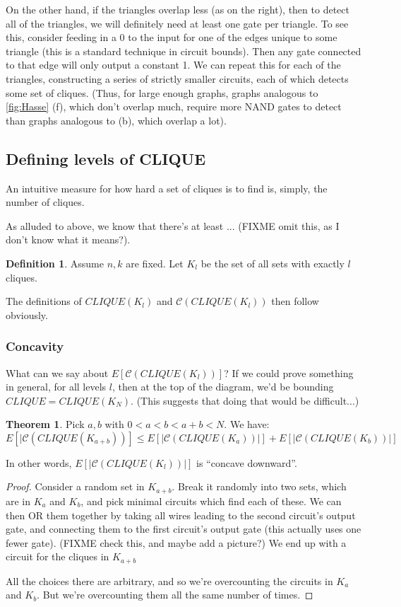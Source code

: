 \documentclass[12pt]{article}
\theoremstyle{definition}
\newtheorem{thm}{Theorem}[section]
\newtheorem{defn}{Definition}[section]
\newcommand{\bigC}[0]{\mathcal{C}}
\begin{document}
On the other hand, if the triangles overlap less (as on the right),
then to detect all of the triangles, we will definitely need at least one
gate per triangle.
To see this, consider feeding in a 0 to the input for one
of the edges unique to some triangle (this is a
standard technique in circuit bounds).
Then any gate connected to
that edge will only output a constant 1. We can repeat this for each of the
triangles, constructing a series of strictly smaller circuits, each of which 
detects some set of cliques. (Thus, for large enough graphs,
graphs analogous to \ref{fig:Hasse} (f), which don't overlap much,
require more NAND gates to detect than graphs 
analogous to (b), which overlap
a lot).

\subsection{Defining levels of CLIQUE}

An intuitive measure for how hard a set of cliques
is to find is, simply, the number of cliques.

As alluded to above, we know that there's at least ... 
(FIXME omit this, as I don't know what it means?).

\begin{defn}
\label{CLIQUE-level}
Assume $n, k$ are fixed. Let $K_l$ be the set of all sets
with exactly $l$ cliques. 
\end{defn}

The definitions of $CLIQUE(K_l)$ and $\bigC(CLIQUE(K_l))$ then
follow obviously.

\subsubsection{Concavity}

What can we say about $E[\bigC(CLIQUE(K_l))]$? If we could
prove something in general, for all levels $l$, then at
the top of the diagram, we'd be bounding
$CLIQUE = CLIQUE(K_N)$. (This suggests that doing that would
be difficult...)


\begin{thm}
\label{concavity}
Pick $a, b$ with $0 < a < b < a+b < N$. We have:
\[
E[|\bigC(CLIQUE(K_{a+b}))] \le
E[|\bigC(CLIQUE(K_a))|] + E[|\bigC(CLIQUE(K_b))|]
\]

In other words, $E[|\bigC(CLIQUE(K_l))|]$ is ``concave downward''.
\end{thm}
\begin{proof}
Consider a random set in $K_{a+b}$. Break it randomly into
two sets, which are in $K_a$ and $K_b$, and pick minimal
circuits which find each of these. We can then OR them together
by taking all wires leading to the second circuit's output gate,
and connecting them to the first circuit's output gate (this
actually uses one fewer gate).
(FIXME check this, and maybe add a picture?)
We end up
with a circuit for the cliques in $K_{a+b}$

All the choices there are arbitrary, and so we're overcounting
the circuits in $K_a$ and $K_b$. But we're overcounting them all
the same number of times.
\end{proof}
\end{document}
